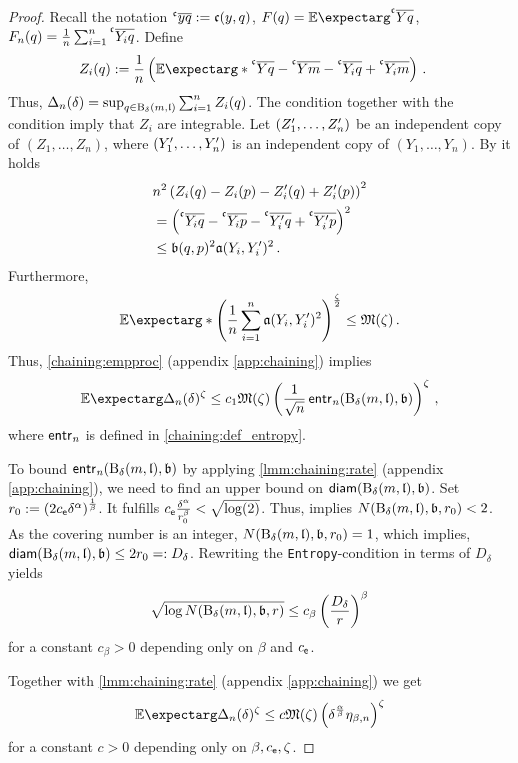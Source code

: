 \begin{proof}
	Recall the notation $\olc yq := \mf c(y,q)$, $F(q) = \Ex{\olc Yq}$,  $F_n(q) = \frac1n \sum_{i=1}^n \olc {Y_i}q$.
	Define
	\begin{align*}
		Z_i(q) 
		&:= 
		\frac1n \br{\Ex*{\olc Yq-\olc Ym}- \olc{Y_i}q+\olc{Y_i}m}
		\eqfs
	\end{align*}
	Thus, $\Delta_n(\delta) = \sup_{q\in\operatorname{\mathrm{B}}_\delta(m, \mathfrak{l})}\sum_{i=1}^n Z_i(q)$.
	The  condition together with the  condition imply that $Z_i$ are integrable.
	Let $(Z_1^\prime, \dots, Z_n^\prime)$ be an independent copy of $(Z_1, \dots, Z_n)$, where $(Y_1^\prime, \dots, Y_n^\prime)$ is an independent copy of $(Y_1, \dots, Y_n)$.
	By  it holds
	\begin{align*}
		&
		n^2\br{Z_i(q)-Z_i(p)-Z_i\pr(q) +Z_i\pr(p)}^2 
		\\&= 
		\br{\olc{Y_i}q-\olc{Y_i}p-\olc{Y_i\pr}q+\olc{Y_i\pr}p}^2
		\\&\leq 
		\mf b(q,p)^2 \mf a(Y_i,Y_i\pr)^2
		\eqfs
	\end{align*}
	Furthermore,
	\begin{equation*}
		\Ex*{\br{\frac1n\sum_{i=1}^n \mf a(Y_i,Y_i\pr)^2}^{\frac\zeta2}} \leq \mf M(\zeta)
		\eqfs
	\end{equation*}
	Thus, \autoref{chaining:empproc} (appendix \autoref{app:chaining}) implies
	\begin{equation*}
		\Ex{\Delta_n(\delta)^\zeta} \leq c_1 \mf M(\zeta) \br{\frac1{\sqrt{n}} \entrn(\ball_\delta(m, \mf l), \mf b)}^\zeta\eqcm
	\end{equation*}
	where $\operatorname{\mathsf{entr}_\mathit{n}}$ is defined in \autoref{chaining:def_entropy}.
	
	To bound $\operatorname{\mathsf{entr}_\mathit{n}}(\operatorname{\mathrm{B}}_\delta(m, \mathfrak{l}), \mathfrak{b})$ by applying \autoref{lmm:chaining:rate} (appendix \autoref{app:chaining}), we need to find an upper bound on $\operatorname{\mathsf{diam}}(\operatorname{\mathrm{B}}_\delta(m, \mathfrak{l}), \mathfrak{b})$.
	Set $r_0 := (2 c_{\mathsf{e}} \delta^\alpha)^{\frac1\beta}$.
	It fulfills $c_{\mathsf{e}} \frac{\delta^\alpha}{r_0^\beta} < \sqrt{\log(2)}$. Thus,  implies $N(\operatorname{\mathrm{B}}_\delta(m, \mathfrak{l}), \mathfrak{b}, r_0) < 2$.
	As the covering number is an integer, $N(\operatorname{\mathrm{B}}_\delta(m, \mathfrak{l}), \mathfrak{b}, r_0) = 1$, which implies, $\operatorname{\mathsf{diam}}(\operatorname{\mathrm{B}}_\delta(m, \mathfrak{l}), \mathfrak{b}) \leq 2r_0 =: D_\delta$.
	Rewriting the  \texttt{Entropy}-condition in terms of $D_\delta$ yields
	\begin{equation*}
	\sqrt{\log N(\operatorname{\mathrm{B}}_\delta(m, \mathfrak{l}), \mathfrak{b}, r)} \leq c_\beta \left( \frac{D_\delta}{r} \right)^\beta
	\end{equation*}
	for a constant $c_\beta > 0$ depending only on $\beta$ and $c_{\mathsf{e}}$.
	
	Together with \autoref{lmm:chaining:rate} (appendix \autoref{app:chaining}) we get
	\begin{equation*}
		\Ex{\Delta_n(\delta)^\zeta} \leq c \mf M(\zeta) \br{\delta^{\frac\alpha\beta} \eta_{\beta,n}}^\zeta
	\end{equation*}
	for a constant $c > 0$ depending only on $\beta, c_{\mathsf{e}}, \zeta$.
\end{proof}
